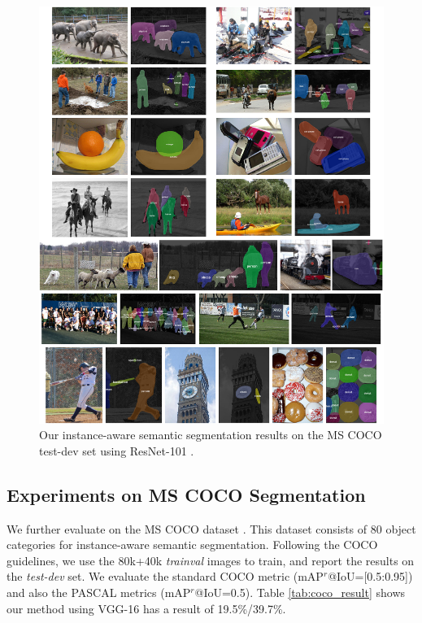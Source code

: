 \documentclass[10pt,twocolumn,letterpaper]{article}
\begin{document}
\begin{figure}[t]
\begin{center}
\includegraphics[width=0.95\linewidth]{figure/coco_results}
\end{center}
\vspace{-1em}
\caption{Our instance-aware semantic segmentation results on the MS COCO test-dev set using ResNet-101 \cite{He2015a}.}
\label{fig:coco_results}
\vspace{-1em}
\end{figure}

\subsection{Experiments on MS COCO Segmentation}

We further evaluate on the MS COCO dataset \cite{Lin2014}.
This dataset consists of 80 object categories for instance-aware semantic segmentation. Following the COCO guidelines, we use the 80k+40k \emph{trainval} images to train, and report the results on the \emph{test-dev} set. We evaluate the standard COCO metric (mAP$^r$@IoU=[0.5:0.95]) and also the PASCAL metrics (mAP$^r$@IoU=0.5). Table \ref{tab:coco_result} shows our method using VGG-16 has a result of 19.5\%/39.7\%.
\end{document}
